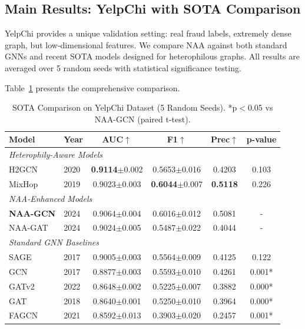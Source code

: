 \subsection{Main Results: YelpChi with SOTA Comparison}

YelpChi provides a unique validation setting: real fraud labels, extremely dense graph, but low-dimensional features. We compare NAA against both standard GNNs and recent SOTA models designed for heterophilous graphs. All results are averaged over 5 random seeds with statistical significance testing.

Table~\ref{tab:yelpchi_sota} presents the comprehensive comparison.

\begin{table}[t]
\centering
\caption{SOTA Comparison on YelpChi Dataset (5 Random Seeds). *p$<$0.05 vs NAA-GCN (paired t-test).}
\label{tab:yelpchi_sota}
\small
\begin{tabular}{llcccc}
\toprule
\textbf{Model} & \textbf{Year} & \textbf{AUC}$\uparrow$ & \textbf{F1}$\uparrow$ & \textbf{Prec}$\uparrow$ & \textbf{p-value} \\
\midrule
\multicolumn{6}{l}{\textit{Heterophily-Aware Models}} \\
H2GCN & 2020 & \textbf{0.9114}$\pm$0.002 & 0.5653$\pm$0.016 & 0.4203 & 0.103 \\
MixHop & 2019 & 0.9023$\pm$0.003 & \textbf{0.6044}$\pm$0.007 & \textbf{0.5118} & 0.226 \\
\midrule
\multicolumn{6}{l}{\textit{NAA-Enhanced Models}} \\
\textbf{NAA-GCN} & 2024 & 0.9064$\pm$0.004 & 0.6016$\pm$0.012 & 0.5081 & - \\
NAA-GAT & 2024 & 0.9024$\pm$0.005 & 0.5487$\pm$0.022 & 0.4044 & - \\
\midrule
\multicolumn{6}{l}{\textit{Standard GNN Baselines}} \\
SAGE & 2017 & 0.9005$\pm$0.003 & 0.5564$\pm$0.009 & 0.4125 & 0.122 \\
GCN & 2017 & 0.8877$\pm$0.003 & 0.5593$\pm$0.010 & 0.4261 & 0.001* \\
GATv2 & 2022 & 0.8648$\pm$0.002 & 0.5225$\pm$0.007 & 0.3882 & 0.000* \\
GAT & 2018 & 0.8640$\pm$0.001 & 0.5250$\pm$0.010 & 0.3964 & 0.000* \\
FAGCN & 2021 & 0.8592$\pm$0.013 & 0.3903$\pm$0.020 & 0.2457 & 0.001* \\
\bottomrule
\end{tabular}
\end{table}

